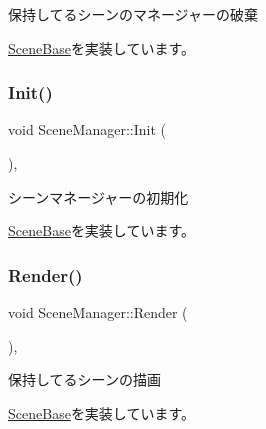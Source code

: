 保持してるシーンのマネージャーの破棄 



\mbox{\hyperlink{class_scene_base_a7c5b54020bc519b4dadfe9770d6b27f7}{Scene\+Base}}を実装しています。

\mbox{\label{class_scene_manager_a6c0e84d0e76f23fb3172839dba5f091b}} 
\subsubsection{\texorpdfstring{Init()}{Init()}}
{\footnotesize\ttfamily void Scene\+Manager\+::\+Init (\begin{DoxyParamCaption}{ }\end{DoxyParamCaption})\hspace{0.3cm}{\ttfamily [final]}, {\ttfamily [virtual]}}



シーンマネージャーの初期化 



\mbox{\hyperlink{class_scene_base_a24d7db43c819924dc8b07b436f6d3148}{Scene\+Base}}を実装しています。

\mbox{\label{class_scene_manager_a968ae7a0065b793f139bda6bcc58d106}} 
\subsubsection{\texorpdfstring{Render()}{Render()}}
{\footnotesize\ttfamily void Scene\+Manager\+::\+Render (\begin{DoxyParamCaption}{ }\end{DoxyParamCaption})\hspace{0.3cm}{\ttfamily [final]}, {\ttfamily [virtual]}}



保持してるシーンの描画 



\mbox{\hyperlink{class_scene_base_ad981674ce731ea267f398e889bbb9dc3}{Scene\+Base}}を実装しています。

\mbox{\label{class_scene_manager_a63dcf65832d6a2c190bf496d9a3b00a3}} 
